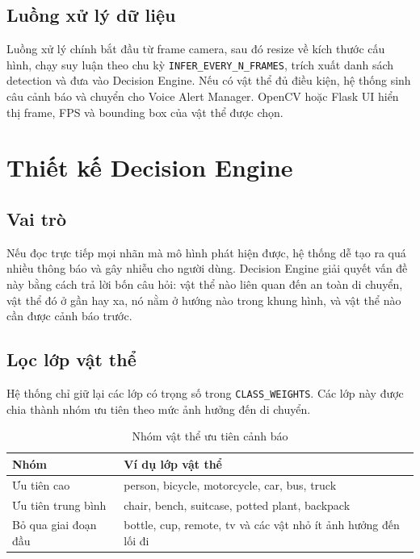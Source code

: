 \documentclass[twoside,final]{hcmut-report}
\begin{document}
\subsection{Luồng xử lý dữ liệu}
Luồng xử lý chính bắt đầu từ frame camera, sau đó resize về kích thước cấu hình, chạy suy luận theo chu kỳ \texttt{INFER\_EVERY\_N\_FRAMES}, trích xuất danh sách detection và đưa vào Decision Engine. Nếu có vật thể đủ điều kiện, hệ thống sinh câu cảnh báo và chuyển cho Voice Alert Manager. OpenCV hoặc Flask UI hiển thị frame, FPS và bounding box của vật thể được chọn.

\begin{center}
\end{center}

\section{Thiết kế Decision Engine}

\subsection{Vai trò}
Nếu đọc trực tiếp mọi nhãn mà mô hình phát hiện được, hệ thống dễ tạo ra quá nhiều thông báo và gây nhiễu cho người dùng. Decision Engine giải quyết vấn đề này bằng cách trả lời bốn câu hỏi: vật thể nào liên quan đến an toàn di chuyển, vật thể đó ở gần hay xa, nó nằm ở hướng nào trong khung hình, và vật thể nào cần được cảnh báo trước.

\subsection{Lọc lớp vật thể}
Hệ thống chỉ giữ lại các lớp có trọng số trong \texttt{CLASS\_WEIGHTS}. Các lớp này được chia thành nhóm ưu tiên theo mức ảnh hưởng đến di chuyển.

\begin{table}[H]
  \centering
  \caption{Nhóm vật thể ưu tiên cảnh báo}
  \label{tab:class-priority}
  \begin{tabularx}{\textwidth}{L{3.4cm}Y}
    \toprule
    \textbf{Nhóm} & \textbf{Ví dụ lớp vật thể} \\
    \midrule
    Ưu tiên cao & person, bicycle, motorcycle, car, bus, truck \\
    Ưu tiên trung bình & chair, bench, suitcase, potted plant, backpack \\
    Bỏ qua giai đoạn đầu & bottle, cup, remote, tv và các vật nhỏ ít ảnh hưởng đến lối đi \\
    \bottomrule
  \end{tabularx}
\end{table}
\end{document}
